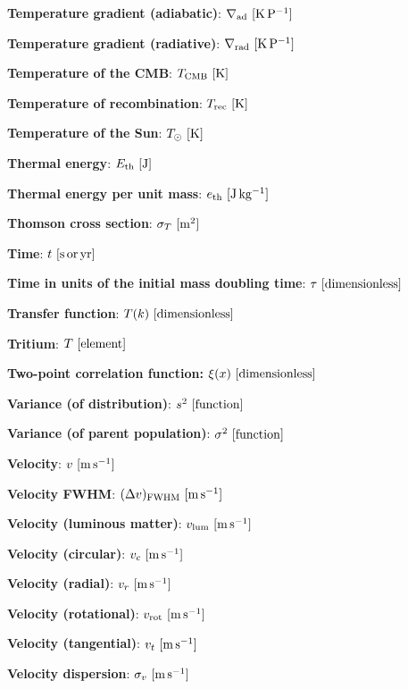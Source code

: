 \documentclass[a4paper,10pt]{article}
\begin{document}
{\noindent}\textbf{Temperature gradient (adiabatic)}: $\nabla_{\rm ad} ~ [{\rm K\,P^{-1}}]$

{\noindent}\textbf{Temperature gradient (radiative)}: $\nabla_{\rm rad} ~ [{\rm K\,P^{-1}}]$

{\noindent}\textbf{Temperature of the CMB}: $T_{\rm CMB} ~ [{\rm K}]$

{\noindent}\textbf{Temperature of recombination}: $T_{\rm rec} ~ [{\rm K}]$

{\noindent}\textbf{Temperature of the Sun}: $T_\odot ~ [{\rm K}]$

{\noindent}\textbf{Thermal energy}: $E_\mathrm{th} ~ [{\rm J}]$

{\noindent}\textbf{Thermal energy per unit mass}: $e_\mathrm{th} ~ [{\rm J\,kg^{-1}}]$

{\noindent}\textbf{Thomson cross section}: $\sigma_T ~ [{\rm m^2}]$

{\noindent}\textbf{Time}: $t ~ [{\rm s\,or\,yr}]$

{\noindent}\textbf{Time in units of the initial mass doubling time}: $\tau ~ [{\rm dimensionless}]$

{\noindent}\textbf{Transfer function}: $T(k) ~ [{\rm dimensionless}]$

{\noindent}\textbf{Tritium}: $T ~ [{\rm element}]$

{\noindent}\textbf{Two-point correlation function:} $\xi(x) ~ [{\rm dimensionless}]$

{\noindent}\textbf{Variance (of distribution)}: $s^2 ~ [{\rm function}]$

{\noindent}\textbf{Variance (of parent population)}: $\sigma^2 ~ [{\rm function}]$

{\noindent}\textbf{Velocity}: $v ~ [{\rm m\,s^{-1}}]$

{\noindent}\textbf{Velocity FWHM}: $(\Delta v)_{\rm FWHM} ~ [{\rm m\,s^{-1}}]$

{\noindent}\textbf{Velocity (luminous matter)}: $v_{\rm lum} ~ [{\rm m\,s^{-1}}]$

{\noindent}\textbf{Velocity (circular)}: $v_c ~ [{\rm m\,s^{-1}}]$

{\noindent}\textbf{Velocity (radial)}: $v_r ~ [{\rm m\,s^{-1}}]$

{\noindent}\textbf{Velocity (rotational)}: $v_\mathrm{rot} ~ [{\rm m\,s^{-1}}]$

{\noindent}\textbf{Velocity (tangential)}: $v_t ~ [{\rm m\,s^{-1}}]$

{\noindent}\textbf{Velocity dispersion}: $\sigma_v ~ [{\rm m\,s^{-1}}]$
\end{document}
